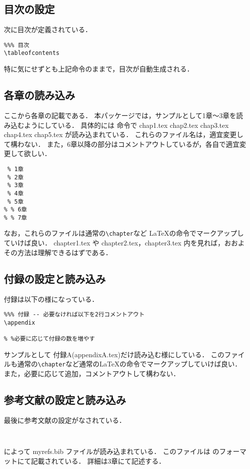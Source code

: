 \subsection{目次の設定}
次に目次が定義されている．
\begin{breakbox}
{\small
\begin{verbatim}
%%% 目次
\tableofcontents
\end{verbatim}
}
\end{breakbox}
特に気にせずとも上記命令のままで，目次が自動生成される．

\subsection{各章の読み込み}
ここから各章の記載である．
本パッケージでは，サンプルとして1章〜3章を読み込むようにしている．
具体的には \verb++ 命令で chap1.tex chap2.tex chap3.tex chap4.tex chap5.tex が読み込まれている．
これらのファイル名は，適宜変更して構わない．
また，6章以降の部分はコメントアウトしているが，各自で適宜変更して欲しい．
\begin{breakbox}
{\small
\begin{verbatim}
 % 1章
 % 2章
 % 3章
 % 4章
 % 5章
% % 6章
% % 7章
\end{verbatim}
}
\end{breakbox}

なお，これらのファイルは通常の\verb+\chapter+など \LaTeX の命令でマークアップしていけば良い．
chapter1.tex や chapter2.tex，chapter3.tex 内を見れば，おおよその方法は理解できるはずである．

\subsection{付録の設定と読み込み}
付録は以下の様になっている．
\begin{breakbox}
{\small
\begin{verbatim}
%%% 付録 -- 必要なければ以下を2行コメントアウト
\appendix

% %必要に応じて付録の数を増やす
\end{verbatim}
}
\end{breakbox}
サンプルとして 付録A(appendixA.tex)だけ読み込む様にしている．
このファイルも通常の\verb+\chapter+など通常の\LaTeX の命令でマークアップしていけば良い．
また，必要に応じて追加，コメントアウトして構わない．

\subsection{参考文献の設定と読み込み}
最後に参考文献の設定がなされている．
\begin{breakbox}
{\small
\begin{verbatim}


\end{verbatim}
}
\end{breakbox}
\verb++によって myrefs.bib ファイルが読み込まれている．
このファイルは \BibTeX のフォーマットにて記載されている．
詳細は3章にて記述する．
